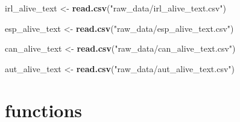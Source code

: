 \documentclass[
]{article}
\newenvironment{Shaded}{\begin{snugshade}}{\end{snugshade}}
\newcommand{\FunctionTok}[1]{\textcolor[rgb]{0.13,0.29,0.53}{\textbf{#1}}}
\newcommand{\NormalTok}[1]{#1}
\newcommand{\OtherTok}[1]{\textcolor[rgb]{0.56,0.35,0.01}{#1}}
\newcommand{\StringTok}[1]{\textcolor[rgb]{0.31,0.60,0.02}{#1}}
\begin{document}
\begin{Shaded}
\begin{Highlighting}[]
\NormalTok{irl\_alive\_text }\OtherTok{\textless{}{-}} \FunctionTok{read.csv}\NormalTok{(}\StringTok{"raw\_data/irl\_alive\_text.csv"}\NormalTok{)}

\NormalTok{esp\_alive\_text }\OtherTok{\textless{}{-}} \FunctionTok{read.csv}\NormalTok{(}\StringTok{"raw\_data/esp\_alive\_text.csv"}\NormalTok{)}

\NormalTok{can\_alive\_text }\OtherTok{\textless{}{-}} \FunctionTok{read.csv}\NormalTok{(}\StringTok{"raw\_data/can\_alive\_text.csv"}\NormalTok{)}

\NormalTok{aut\_alive\_text }\OtherTok{\textless{}{-}} \FunctionTok{read.csv}\NormalTok{(}\StringTok{"raw\_data/aut\_alive\_text.csv"}\NormalTok{) }
\end{Highlighting}
\end{Shaded}

\hypertarget{functions}{%
\section{functions}\label{functions}}
\end{document}
